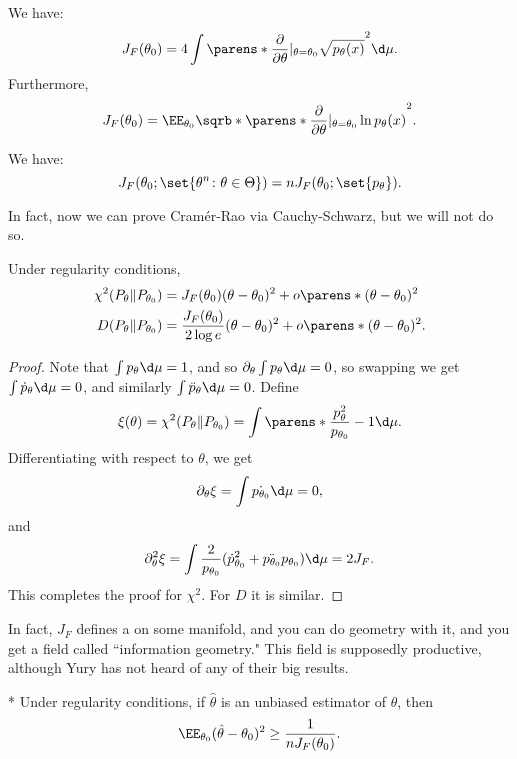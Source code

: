\begin{fact}
	We have: \[
		J_F(\theta_0) = 4\int \parens*{\frac{\partial}{\partial \theta}|_{\theta=\theta_0} \sqrt{p_\theta(x)}}^2 \d\mu.
	\]
	Furthermore, \[
		J_F(\theta_0) = \EE_{\theta_0} \sqrb*{
			\parens*{
				\frac{\partial}{\partial \theta}|_{\theta = \theta_0} \ln p_\theta(x)
			}^2
		}.
	\]
\end{fact}

\begin{cor}
	We have: \[
		J_F(\theta_0; \set{\theta^n \colon \theta\in \Theta}) = n J_F(\theta_0; \set{p_\theta}).
	\]	
\end{cor}

In fact, now we can prove Cram\'er-Rao via Cauchy-Schwarz, but we will not do so.

\begin{thm}
	Under regularity conditions, \begin{align*}
		\chi^2(P_\theta \Vert P_{\theta_0}) &= J_F(\theta_0) (\theta - \theta_0)^2 + o\parens*{(\theta-\theta_0)^2} \\
		D(P_\theta \Vert P_{\theta_0}) &= \frac{J_F(\theta_0)}{2\log e} (\theta - \theta_0)^2 + o\parens*{(\theta - \theta_0)^2}.
	\end{align*}
\end{thm}

\begin{proof}
	Note that $\int p_\theta \d \mu = 1$, and so $\partial_\theta \int p_\theta \d \mu = 0$, so swapping we get $\int \dot p_\theta \d \mu = 0$, and similarly $\int \ddot p_\theta \d \mu = 0$.
	Define \[
		\xi(\theta) = \chi^2(P_\theta \Vert P_{\theta_0}) = \int \parens*{\frac{p_\theta^2}{p_{\theta_0}} - 1} \d \mu.
	\]
	Differentiating with respect to $\theta$, we get \[
		\partial_\theta \xi = \int \dot{p_{\theta_0}} \d \mu = 0,
	\]
	and \[
		\partial^2_\theta \xi = \int \frac{2}{p_{\theta_0}} (\dot p_{\theta_0}^2 + \ddot{p_{\theta_0}} p_{\theta_0}) \d\mu = 2J_F.
	\]
	This completes the proof for $\chi^2$. For $D$ it is similar. 
\end{proof}

In fact, $J_F$ defines a  on some manifold, and you can do geometry with it, and you get a field called ``information geometry." This field is supposedly productive, although Yury has not heard of any of their big results.

\begin{cor}*
	Under regularity conditions, if $\hat \theta$ is an unbiased estimator of $\theta$, then \[
		\EE_{\theta_0} (\hat \theta - \theta_0)^2 \geq \frac{1}{nJ_F(\theta_0)}.
	\]
\end{cor}

